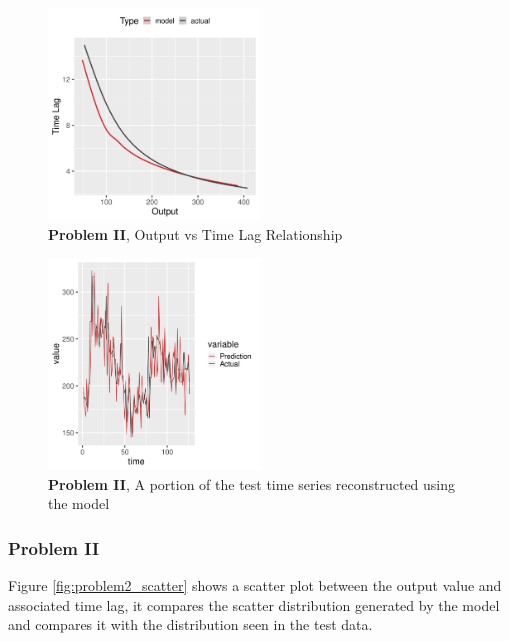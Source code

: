 \documentclass[runningheads]{llncs}
\begin{document}
\begin{figure}[h]
\vspace{.3in}
\centerline{\includegraphics[width=0.5\textwidth]{figures/exp2_predictive_curves.png}}
\vspace{.3in}
\caption{\textbf{Problem II}, Output vs Time Lag Relationship}
\label{fig:problem2_curves}
\end{figure}

\begin{figure}[h]
\vspace{.3in}
\centerline{\includegraphics[width=0.5\textwidth]{figures/exp2_timeseries_pred.png}}
\vspace{.3in}
\caption{\textbf{Problem II}, A portion of the test time series reconstructed using the model}
\label{fig:problem2_timeseries}
\end{figure}


\subsubsection{Problem II}

Figure \ref{fig:problem2_scatter} shows a scatter plot between the output value and associated 
time lag, it compares the scatter distribution generated by the model and compares it with the 
distribution seen in the test data.
\end{document}
